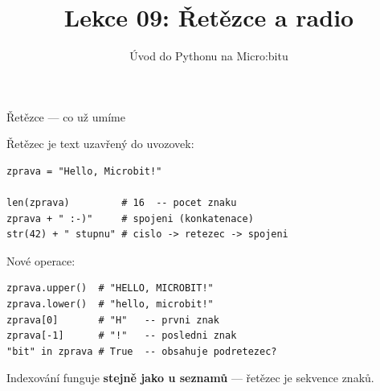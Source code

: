 

\title{Lekce 09: Řetězce a radio}
\subtitle{Úvod do Pythonu na Micro:bitu}
\date{}



\begin{frame}
  \titlepage
\end{frame}

\begin{frame}[fragile]{Řetězce — co už umíme}

  Řetězec je text uzavřený do uvozovek:

  \bigskip
  \begin{lstlisting}
zprava = "Hello, Microbit!"

len(zprava)         # 16  -- pocet znaku
zprava + " :-)"     # spojeni (konkatenace)
str(42) + " stupnu" # cislo -> retezec -> spojeni
  \end{lstlisting}

  \pause\bigskip
  Nové operace:

  \begin{lstlisting}
zprava.upper()  # "HELLO, MICROBIT!"
zprava.lower()  # "hello, microbit!"
zprava[0]       # "H"   -- prvni znak
zprava[-1]      # "!"   -- posledni znak
"bit" in zprava # True  -- obsahuje podretezec?
  \end{lstlisting}

  \bigskip
  Indexování funguje \textbf{stejně jako u seznamů} — řetězec je sekvence znaků.
\end{frame}

